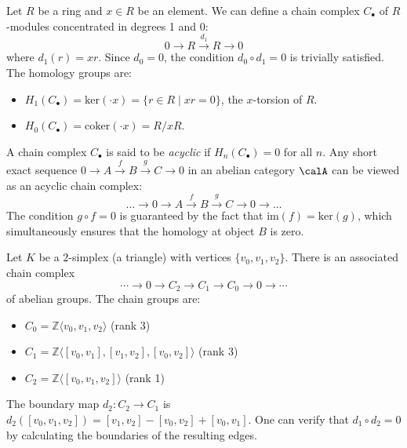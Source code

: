 \begin{example}
Let $R$ be a ring and $x \in R$ be an element. We can define a chain complex $C_\bullet$ of $R$-modules concentrated in degrees 1 and 0:
\[
0 \to R \xrightarrow{d_1} R \to 0
\]
where $d_1(r) = xr$. Since $d_0 = 0$, the condition $d_0 \circ d_1 = 0$ is trivially satisfied. The homology groups are:
\begin{itemize}
    \item $H_1(C_\bullet) = \text{ker}(\cdot x) = \{r \in R \mid xr = 0\}$, the $x$-torsion of $R$.
    \item $H_0(C_\bullet) = \text{coker}(\cdot x) = R/xR$.
\end{itemize}
\end{example}

\begin{example}
A chain complex $C_\bullet$ is said to be \textit{acyclic} if $H_n(C_\bullet) = 0$ for all $n$. Any short exact sequence $0 \to A \xrightarrow{f} B \xrightarrow{g} C \to 0$ in an abelian category $\calA$ can be viewed as an acyclic chain complex:
\[
\dots \to 0 \to A \xrightarrow{f} B \xrightarrow{g} C \to 0 \to \dots
\]
The condition $g \circ f = 0$ is guaranteed by the fact that $\text{im}(f) = \text{ker}(g)$, which simultaneously ensures that the homology at object $B$ is zero.
\end{example}

\begin{example}
Let $K$ be a 2-simplex (a triangle) with vertices $\{v_0, v_1, v_2\}$. There is an associated chain complex
$$\cdots \to 0 \to C_2 \to C_1 \to C_0 \to 0 \to \cdots$$
of abelian groups. The chain groups are:
\begin{itemize}
    \item $C_0 = \mathbb{Z}\langle v_0, v_1, v_2 \rangle$ (rank 3)
    \item $C_1 = \mathbb{Z}\langle [v_0,v_1], [v_1,v_2], [v_0,v_2] \rangle$ (rank 3)
    \item $C_2 = \mathbb{Z}\langle [v_0,v_1,v_2] \rangle$ (rank 1)
\end{itemize}
The boundary map $d_2: C_2 \to C_1$ is $d_2([v_0,v_1,v_2]) = [v_1,v_2] - [v_0,v_2] + [v_0,v_1]$. One can verify that $d_1 \circ d_2 = 0$ by calculating the boundaries of the resulting edges.
\end{example}





